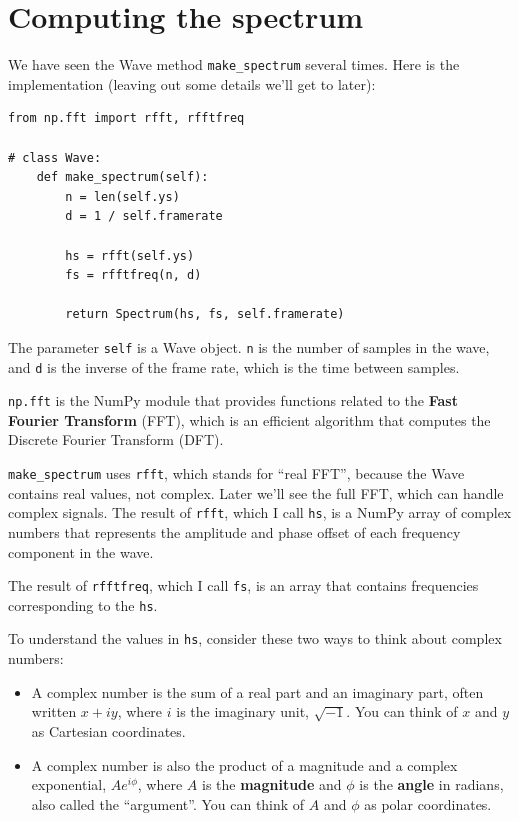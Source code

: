 \documentclass[12pt]{book}
\begin{document}
\section{Computing the spectrum}

We have seen the Wave method \verb"make_spectrum" several times.
Here is the implementation (leaving out some details we'll get
to later):

\begin{verbatim}
from np.fft import rfft, rfftfreq

# class Wave:
    def make_spectrum(self):
        n = len(self.ys)
        d = 1 / self.framerate

        hs = rfft(self.ys)
        fs = rfftfreq(n, d)

        return Spectrum(hs, fs, self.framerate)
\end{verbatim}

The parameter {\tt self} is a Wave object.  {\tt n} is the number
of samples in the wave, and {\tt d} is the inverse of the
frame rate, which is the time between samples.

{\tt np.fft} is the NumPy module that provides functions related
to the {\bf Fast Fourier Transform} (FFT), which is an efficient
algorithm that computes the Discrete Fourier Transform (DFT).

\verb"make_spectrum" uses {\tt rfft}, which stands for ``real
FFT'', because the Wave contains real values, not complex.  Later
we'll see the full FFT, which can handle complex signals.  The result
of {\tt rfft}, which I call {\tt hs}, is a NumPy array of complex
numbers that represents the amplitude and phase offset of each
frequency component in the wave.

The result of {\tt rfftfreq}, which I call {\tt fs}, is an array that
contains frequencies corresponding to the {\tt hs}.

To understand the values in {\tt hs}, consider these two ways to think
about complex numbers:

\begin{itemize}

\item A complex number is the sum of a real part and an imaginary
  part, often written $x + iy$, where $i$ is the imaginary unit,
  $\sqrt{-1}$.  You can think of $x$ and $y$ as Cartesian coordinates.

\item A complex number is also the product of a magnitude and a
  complex exponential, $A e^{i \phi}$, where $A$ is the {\bf
    magnitude} and $\phi$ is the {\bf angle} in radians, also called
  the ``argument''.  You can think of $A$ and $\phi$ as polar
  coordinates.

\end{itemize}
\end{document}
